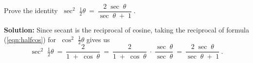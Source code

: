 \begin{center}\end{center}
\newpage
\begin{exmp}
 Prove the identity $\;\sec^2 \;\tfrac{1}{2}\theta ~=~\dfrac{2\;\sec\;\theta}{\sec\;\theta \;+\; 1}\;$.\vspace{1mm}
 \par\noindent\textbf{Solution:} Since secant is the reciprocal of cosine, taking the reciprocal of
 formula (\ref{eqn:halfcos}) for $\;\cos^2 \;\tfrac{1}{2}\theta$ gives us
 \begin{displaymath}
  \sec^2 \;\tfrac{1}{2}\theta ~=~ \frac{2}{1 \;+\; \cos\;\theta}
  ~=~ \frac{2}{1 \;+\; \cos\;\theta} \;\cdot\; \frac{\sec\;\theta}{\sec\;\theta}
  ~=~ \frac{2\;\sec\;\theta}{\sec\;\theta \;+\; 1} ~.
 \end{displaymath}
\end{exmp}\vspace{-1mm}
\divider
\vspace{2mm}

